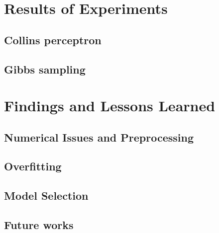 \documentclass[twoside,12pt]{article}
\begin{document}
\section{Results of Experiments}
\subsection{Collins perceptron}



\subsection{Gibbs sampling}

\section{Findings and Lessons Learned}
\subsection{Numerical Issues and Preprocessing}
\subsection{Overfitting}
\subsection{Model Selection}
\subsection{Future works}
\end{document}
